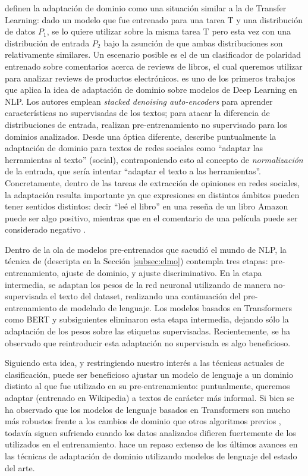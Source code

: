 \citet{goodfellow2016deep} definen la adaptación de dominio como una situación similar a la de Transfer Learning: dado un modelo que fue entrenado para una tarea T y una distribución de datos $P_1$, se lo quiere utilizar sobre la misma tarea T pero esta vez con una distribución de entrada $P_2$ bajo la asunción de que ambas distribuciones son relativamente similares. Un escenario posible es el de un clasificador de polaridad entrenado sobre comentarios acerca de reviews de libros, el cual queremos utilizar para analizar reviews de productos electrónicos. \citet{glorot2011domain} es uno de los primeros trabajos que aplica la idea de adaptación de dominio sobre modelos de Deep Learning en NLP. Los autores emplean \emph{stacked denoising auto-encoders} para aprender características no supervisadas de los textos; para atacar la diferencia de distribuciones de entrada, realizan pre-entrenamiento no supervisado para los dominios analizados. Desde una óptica diferente, \citet{eisenstein2013bad} describe puntualmente la adaptación de dominio para textos de redes sociales como ``adaptar las herramientas al texto'' (social), contraponiendo esto al concepto de \emph{normalización} de la entrada, que sería intentar ``adaptar el texto a las herramientas''. Concretamente, dentro de las tareas de extracción de opiniones en redes sociales, la adaptación resulta importante ya que expresiones en distintos ámbitos pueden tener sentidos distintos: decir ``leé el libro'' en una reseña de un libro Amazon puede ser algo positivo, mientras que en el comentario de una película puede ser considerado negativo \cite{pang2008opinion}.



Dentro de la ola de modelos pre-entrenados que sacudió el mundo de NLP, la técnica de \ulmfit{} \cite{howard-ruder-2018-universal} (descripta en la Sección \ref{subsec:elmo}) contempla tres etapas: pre-entrenamiento, ajuste de dominio, y ajuste discriminativo. En la etapa intermedia, se adaptan los pesos de la red neuronal utilizando de manera no-supervisada el texto del dataset, realizando una continuación del pre-entrenamiento de modelado de lenguaje. Los modelos basados en Transformers como BERT \cite{devlin2018bert} y subsiguientes eliminaron esta etapa intermedia, dejando sólo la adaptación de los pesos sobre las etiquetas supervisadas. Recientemente, se ha observado que reintroducir esta adaptación no supervisada es algo beneficioso.

Siguiendo esta idea, y restringiendo nuestro interés a las técnicas actuales de clasificación, puede ser beneficioso ajustar un modelo de lenguaje a un dominio distinto al que fue utilizado en su pre-entrenamiento: puntualmente, queremos adaptar \bert{} (entrenado en Wikipedia) a textos de carácter más informal. Si bien se ha observado que los modelos de lenguaje basados en Transformers son mucho más robustos frente a los cambios de dominio que otros algoritmos previos \cite{hendrycks-etal-2020-pretrained}, todavía siguen sufriendo cuando los datos analizados difieren fuertemente de los utilizados en el entrenamiento. \citet{ruder2021lmfine-tuning} hace un repaso extenso de los últimos avances en las técnicas de adaptación de dominio utilizando modelos de lenguaje del estado del arte.


